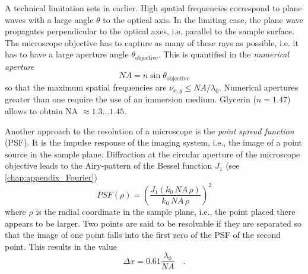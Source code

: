 A technical limitation sets in earlier. High spatial frequencies correspond to plane waves with a large angle $\theta$ to the optical axis. In the limiting case, the plane wave propagates perpendicular to the optical axes, i.e. parallel to the sample surface. The microscope objective has to capture as many of these rays as possible, i.e. it has to have a large aperture angle $\theta_\text{objective}$. This is quantified in the \emph{numerical aperture} 
\begin{equation}
    NA = n \sin \theta_\text{objective}
\end{equation}
so that the maximum spatial frequencies are $\nu_{x,y} \le NA / \lambda_0$. Numerical apertures greater than one require the use of an immersion medium. Glycerin ($n=1.47$) allows to obtain NA $\approx 1.3 \dots 1.45$.

Another approach to the resolution of a microscope is the \emph{point spread function} (PSF). It is the impulse response of the imaging system, i.e., the image of a point source in the sample plane. Diffraction at the circular aperture of the microscope objective leads to the Airy-pattern of the Bessel function $J_1$ (see \ref{chap:appendix_Fourier})
\begin{equation}
    PSF(\rho) = \left( \frac{J_1( k_0 \, {NA} \, \rho )}{ k_0 \, {NA} \, \rho}  \right)^2
\end{equation}
where $\rho$ is the radial coordinate in the sample plane, i.e., the point placed there appears to be larger. Two points are said to be resolvable if they are separated so that the image of one point falls into the first zero of the PSF of the second point. This results in the value 
\begin{equation}
    \Delta x = 0.61 \frac{\lambda_0}{{NA}} \quad .
\end{equation}


\printbibliography[segment=\therefsegment,heading=subbibliography]

